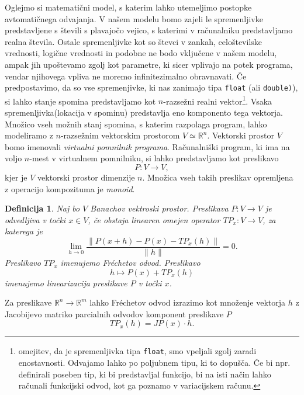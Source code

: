 \documentclass{article}
\newcommand{\RR}{\mathbb{R}}
\newtheorem{definicija}{Definicija}[section]
\begin{document}
Oglejmo si matematični model, s katerim lahko utemeljimo postopke avtomatičnega
odvajanja. V našem modelu bomo zajeli le spremenljivke predstavljene s števili s
plavajočo vejico,  s katerimi v računalniku predstavljamo realna števila. 
Ostale spremenljivke kot so števci v zankah, celoštevilske vrednosti, logične
vrednosti in podobne ne bodo vključene v našem modelu, ampak jih upoštevamo
zgolj kot parametre, ki sicer vplivajo na potek programa, vendar njihovega
vpliva ne moremo infinitezimalno obravnavati. Če predpostavimo, da so vse
spremenjivke, ki nas zanimajo tipa \texttt{float} (ali \texttt{double)}), si lahko stanje spomina
predstavljamo kot $n$-razsežni realni vektor\footnote[1]{omejitev, da je
  spremenljivka tipa \texttt{float}, smo vpeljali zgolj zaradi enostavnosti.
  Odvajamo lahko po poljubnem tipu, ki to dopušča. Če bi npr. definirali
  poseben tip, ki bi predstavljal funkcijo, bi na isti način lahko računali
  funkcijski odvod, kot ga poznamo v variacijskem računu.}. Vsaka spremenljivka(lokacija v
spominu) predstavlja eno komponento tega vektorja. Množico vseh možnih stanj
spomina, s katerim razpolaga program, lahko modeliramo z $n$-razsežnim
vektorskim prostorom $V\simeq\RR^n$. Vektorski prostor $V$ bomo imenovali
\emph{virtualni pomnilnik programa}. Računalniški program, ki
ima na voljo $n$-mest v virtualnem pomnilniku, si lahko predstavljamo kot preslikavo
\begin{equation}
  \label{eq:program_kot_preslikava}
  P: V\to V,
\end{equation}
kjer je $V$ vektorski prostor dimenzije $n$. Množica vseh takih preslikav
opremljena z operacijo kompozituma je \emph{monoid}.
\begin{definicija}
  Naj bo $V$ Banachov vektroski prostor. Preslikava $P:V\to V$ je odvedljiva v
  točki $x\in V$, če obstaja
  linearen omejen operator $TP_x:V\to V$, za katerega je
  \begin{equation}
    \label{eq:frechet}
    \lim_{h\to 0}\frac{\|P(x+h)-P(x)-TP_x(h)\|}{\|h\|} = 0.
  \end{equation}
  Preslikavo $TP_x$ imenujemo \emph{Fréchetov odvod}. Preslikavo 
  \begin{equation}
    \label{eq:linearizacija}
    h\mapsto P(x)+TP_x(h)
  \end{equation}
 imenujemo \emph{linearizacija} preslikave $P$ v točki $x$.
\end{definicija}
Za preslikave $\RR^n\to \RR^m$ lahko Fréchetov odvod
izrazimo kot množenje vektorja $h$ z Jacobijevo matriko parcialnih odvodov
komponent preslikave $P$
\begin{equation*}
  TP_x(h) = JP(x)\cdot h.
\end{equation*}
\end{document}
